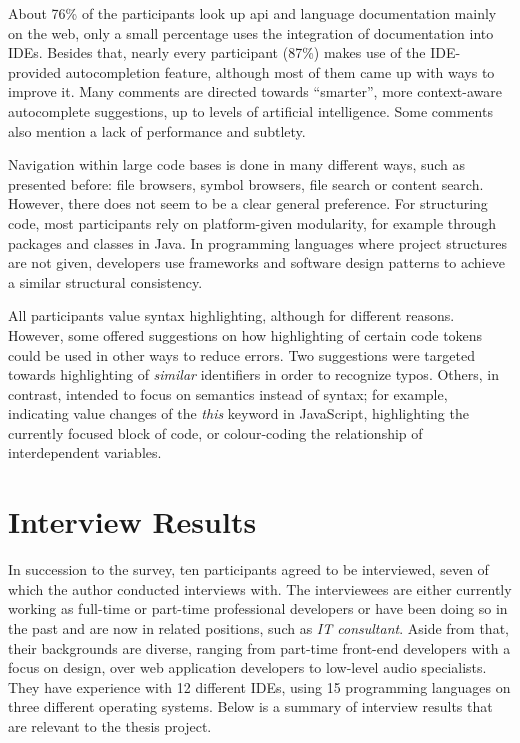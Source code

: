 About 76\% of the participants look up \ac{api} and language
documentation mainly on the web, only a small percentage uses the
integration of documentation into IDEs. Besides that, nearly every
participant (87\%) makes use of the IDE-provided \gls{autocompletion}
feature, although most of them came up with ways to improve it. Many
comments are directed towards “smarter”, more context-aware autocomplete
suggestions, up to levels of artificial intelligence. Some comments also
mention a lack of performance and subtlety.

Navigation within large code bases is done in many different ways, such
as presented before: file browsers, symbol browsers, file search or
content search. However, there does not seem to be a clear general
preference. For structuring code, most participants rely on
platform-given modularity, for example through packages and classes in
Java. In programming languages where project structures are not given,
developers use frameworks and software design patterns to achieve a
similar structural consistency.

All participants value syntax highlighting, although for different
reasons. However, some offered suggestions on how highlighting of
certain code tokens could be used in other ways to reduce errors. Two
suggestions were targeted towards highlighting of \emph{similar}
identifiers in order to recognize typos. Others, in contrast, intended
to focus on semantics instead of syntax; for example, indicating value
changes of the \emph{this} keyword in JavaScript, highlighting the
currently focused block of code, or colour-coding the relationship of
interdependent variables.

\section{Interview Results}\label{interview-results}

In succession to the survey, ten participants agreed to be interviewed,
seven of which the author conducted interviews with. The interviewees
are either currently working as full-time or part-time professional
developers or have been doing so in the past and are now in related
positions, such as \emph{IT consultant}. Aside from that, their
backgrounds are diverse, ranging from part-time front-end developers
with a focus on design, over web application developers to low-level
audio specialists. They have experience with 12 different IDEs, using 15
programming languages on three different operating systems. Below is a
summary of interview results that are relevant to the thesis project.

